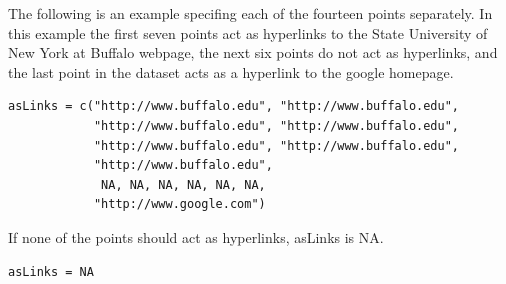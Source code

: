 \documentclass[]{article}
\begin{document}
\indent The following is an example specifing each of the fourteen points separately. In this example the first seven points act as hyperlinks to the State University of New York at Buffalo webpage, the next six points do not act as hyperlinks, and the last point in the dataset acts as a hyperlink to the google homepage. 

\begin{verbatim}
asLinks = c("http://www.buffalo.edu", "http://www.buffalo.edu", 
            "http://www.buffalo.edu", "http://www.buffalo.edu", 
            "http://www.buffalo.edu", "http://www.buffalo.edu", 
            "http://www.buffalo.edu",
             NA, NA, NA, NA, NA, NA, 
            "http://www.google.com")
\end{verbatim}

\indent If none of the points should act as hyperlinks, asLinks is NA.

\begin{verbatim}
asLinks = NA
\end{verbatim} 
\end{document}
